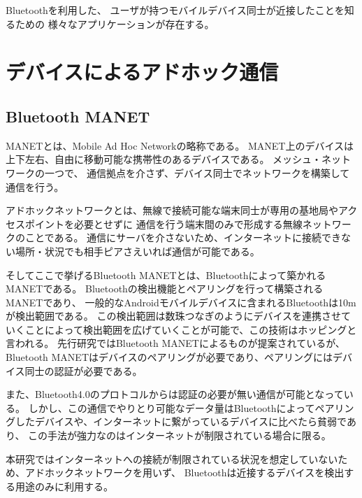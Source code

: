 Bluetoothを利用した、
ユーザが持つモバイルデバイス同士が近接したことを知るための
様々なアプリケーション\cite{すれちがったー}\cite{encountme}\cite{Monac}が存在する。



\section{デバイスによるアドホック通信}

\subsection{Bluetooth MANET}

MANETとは、Mobile Ad Hoc Networkの略称である。
MANET上のデバイスは上下左右、自由に移動可能な携帯性のあるデバイスである。
メッシュ・ネットワークの一つで、
通信拠点を介さず、デバイス同士でネットワークを構築して通信を行う。

アドホックネットワークとは、無線で接続可能な端末同士が専用の基地局やアクセスポイントを必要とせずに
通信を行う端末間のみで形成する無線ネットワークのことである。
通信にサーバを介さないため、インターネットに接続できない場所・状況でも相手ピアさえいれば通信が可能である。

そしてここで挙げるBluetooth MANETとは、Bluetoothによって築かれるMANETである。
Bluetoothの検出機能とペアリングを行って構築されるMANETであり、
一般的なAndroidモバイルデバイスに含まれるBluetoothは10mが検出範囲である。
この検出範囲は数珠つなぎのようにデバイスを連携させていくことによって検出範囲を広げていくことが可能で、この技術はホッピングと言われる。
先行研究ではBluetooth MANETによるものが提案されているが、
Bluetooth MANETはデバイスのペアリングが必要であり、ペアリングにはデバイス同士の認証が必要である。

また、Bluetooth4.0のプロトコルからは認証の必要が無い通信が可能となっている。
しかし、この通信でやりとり可能なデータ量はBluetoothによってペアリングしたデバイスや、インターネットに繋がっているデバイスに比べたら貧弱であり、
この手法が強力なのはインターネットが制限されている場合に限る。

本研究ではインターネットへの接続が制限されている状況を想定していないため、アドホックネットワークを用いず、
Bluetoothは近接するデバイスを検出する用途のみに利用する。
